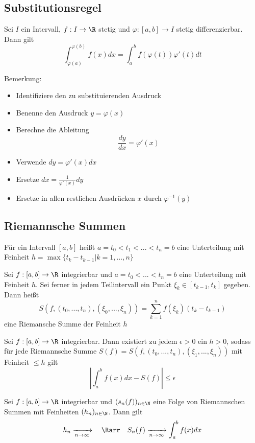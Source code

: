 	\subsection{Substitutionsregel}
		\begin{Satz} [ ]
			Sei $I$ ein Intervall, $f:I\to\R$ stetig und $\varphi:[a, b]\to I$ stetig differenzierbar. Dann gilt
			$$
				\int_{\varphi(a)}^{\varphi(b)}f(x)dx=\int_a^bf(\varphi(t))\varphi'(t)dt
			$$
		\end{Satz}
		Bemerkung: \newline
		\begin{itemize}
			\item Identifiziere den zu substituierenden Ausdruck
			\item Benenne den Ausdruck $y=\varphi(x)$
			\item Berechne die Ableitung
				$$
					\frac{dy}{dx}=\varphi'(x)
				$$
			\item Verwende $dy=\varphi'(x)dx$
			\item Ersetze $dx=\frac{1}{\varphi'(x)}dy$
			\item Ersetze in allen restlichen Ausdrücken $x$ durch $\varphi^{-1}(y)$
		\end{itemize}
	\subsection{Riemannsche Summen}
		\begin{Definition} 
			Für ein Intervall $[a, b]$ heißt $a=t_0<t_1<...<t_n=b$ eine Unterteilung mit Feinheit $h=\max\{t_k-t_{k-1}|k=1,...,n\}$
		\end{Definition}
		\begin{Definition} 
			Sei $f:[a, b]\to\R$ integrierbar und $a=t_0<...<t_n=b$ eine Unterteilung mit Feinheit $h$. Sei ferner in jedem Teilintervall ein Punkt $\xi_k\in[t_{k-1},t_k]$ gegeben. Dann heißt
			$$
				S(f,(t_0,...,t_n),(\xi_0,...,\xi_n))=\sum_{k=1}^nf(\xi_k)(t_k-t_{k-1})
			$$
			eine Riemansche Summe der Feinheit $h$
		\end{Definition}
		\begin{Satz} [ ]
			Sei $f:[a, b]\to\R$ integrierbar. Dann existiert zu jedem $\epsilon>0$ ein $h>0$, sodass für jede Riemannsche Summe $S(f)=S(f,(t_0,...,t_n),(\xi_1,...,\xi_n))$ mit Feinheit $\leq h$ gilt
			$$
				|\int_a^bf(x)dx-S(f)|\leq\epsilon
			$$
		\end{Satz}
		\begin{Satz} [ ]
			Sei $f:[a, b]\to\R$ integrierbar und $(s_n(f))_{n\in\N}$ eine Folge von Riemannschen Summen mit Feinheiten $(h_n)_{n\in\N}$. Dann gilt
			$$
				h_n	\xrightarrow[n\to\infty]{} \quad\Rarr\quad	 S_n(f)\xrightarrow[n\to\infty]{}\int_a^bf(x)dx
			$$
		\end{Satz}
